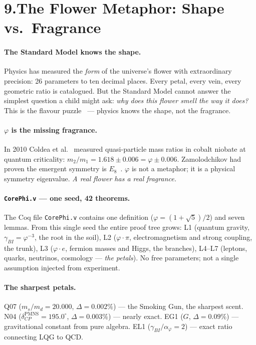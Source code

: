 \documentclass[12pt,a4paper]{article}
\newcommand{\ph}{\varphi}
\newcommand{\aph}{\alpha_{\varphi}}
\newcommand{\gam}{\gamma_{\!BI}}
\begin{document}
\section*{9.\quad The Flower Metaphor: Shape vs.\ Fragrance}

\paragraph{The Standard Model knows the shape.}
Physics has measured the \emph{form} of the universe's flower with extraordinary
precision: 26 parameters to ten decimal places.
Every petal, every vein, every geometric ratio is catalogued.
But the Standard Model cannot answer the simplest question a child might ask:
\emph{why does this flower smell the way it does?}
This is the flavour puzzle~\cite{Ellis2012} --- physics knows the shape,
not the fragrance.

\paragraph{$\ph$ is the missing fragrance.}
In 2010 Coldea et al.~\cite{coldea2010} measured quasi-particle mass ratios in
cobalt niobate at quantum criticality:
$m_2/m_1 = 1.618\pm0.006 = \ph\pm0.006$.
Zamolodchikov had proven the emergent symmetry is $E_8$~\cite{zamolodchikov1989}.
$\ph$ is not a metaphor; it is a physical symmetry eigenvalue.
\emph{A real flower has a real fragrance.}

\paragraph{\texttt{CorePhi.v} --- one seed, 42 theorems.}
The Coq file \texttt{CorePhi.v} contains one definition ($\ph = (1+\sqrt{5})/2$)
and seven lemmas.
From this single seed the entire proof tree grows:
L1 (quantum gravity, $\gam = \ph^{-3}$, the root in the soil),
L2 ($\ph\cdot\pi$, electromagnetism and strong coupling, the trunk),
L3 ($\ph\cdot e$, fermion masses and Higgs, the branches),
L4--L7 (leptons, quarks, neutrinos, cosmology --- \emph{the petals}).
No free parameters; not a single assumption injected from experiment.

\paragraph{The sharpest petals.}
Q07 ($m_s/m_d=20.000$, $\Delta=0.002\%$) --- the Smoking Gun, the sharpest scent.
N04 ($\delta_{CP}^{\mathrm{PMNS}}=195.0^\circ$, $\Delta=0.003\%$) --- nearly exact.
EG1 ($G$, $\Delta=0.09\%$) --- gravitational constant from pure algebra.
EL1 ($\gam/\aph=2$) --- exact ratio connecting LQG to QCD.
\end{document}
